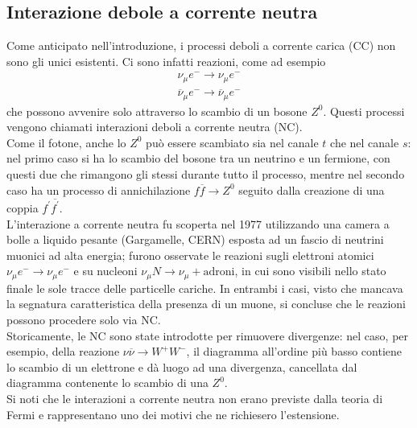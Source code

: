 \documentclass{subnucbo}
\begin{document}
\subsection{Interazione debole a corrente neutra}
Come anticipato nell'introduzione, i processi deboli a corrente carica (CC) non sono gli unici esistenti. Ci sono infatti reazioni, come ad esempio
\begin{equation}
        \begin{array} { c } { \nu _ { \mu } e ^ { - } \rightarrow \nu _ { \mu } e ^ { - } } \\ { \overline { \nu } _ { \mu } e ^ { - } \rightarrow \overline { \nu } _ { \mu } e ^ { - } } \end{array}
        \label{eq:neutral_current}
\end{equation}
che possono avvenire solo attraverso lo scambio di un bosone $Z^{0}$. Questi processi vengono chiamati interazioni deboli a corrente neutra (NC). \\
Come il fotone, anche lo $Z^{0}$ può essere scambiato sia nel canale $t$ che nel canale $s$: nel primo caso si ha lo scambio del bosone tra un neutrino e un fermione, con questi due che rimangono gli stessi durante tutto il processo, mentre nel secondo caso ha un processo di annichilazione $f \overline { f } \rightarrow Z ^ { 0 }$ seguito dalla creazione di una coppia $f ^ { \prime } \overline { f ^ { \prime } }$. \\
L'interazione a corrente neutra fu scoperta nel 1977 utilizzando una camera a bolle a liquido pesante (Gargamelle, CERN) esposta ad un fascio di neutrini muonici ad alta energia; furono osservate le reazioni sugli elettroni atomici $\nu _ { \mu } e ^ { - } \rightarrow \nu _ { \mu } e ^ { - }$ e su nucleoni $\nu _ { \mu } N \rightarrow \nu _ { \mu } + \text {adroni}$, in cui sono visibili nello stato finale le sole tracce delle particelle cariche. In entrambi i casi, visto che mancava la segnatura caratteristica della presenza di un muone, si concluse che le reazioni possono procedere solo via NC. \\
Storicamente, le NC sono state introdotte per rimuovere divergenze: nel caso, per esempio, della reazione $\nu \overline { \nu } \rightarrow W ^ { + } W ^ { - }$, il diagramma all'ordine più basso contiene lo scambio di un elettrone e dà luogo ad una divergenza, cancellata dal diagramma contenente lo scambio di una $Z^{0}$. \\
Si noti che le interazioni a corrente neutra non erano previste dalla teoria di Fermi e rappresentano uno dei motivi che ne richiesero l'estensione.
\end{document}
